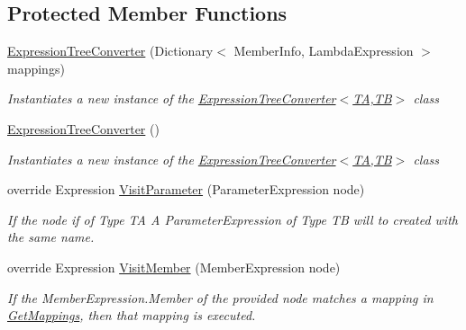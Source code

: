 \subsection*{Protected Member Functions}
\begin{DoxyCompactItemize}
\item 
\hyperlink{classCqrs_1_1Sql_1_1DataStores_1_1ExpressionTreeConverter_a6c0d0c72deab71e40aa9e1526fd82593_a6c0d0c72deab71e40aa9e1526fd82593}{Expression\+Tree\+Converter} (Dictionary$<$ Member\+Info, Lambda\+Expression $>$ mappings)
\begin{DoxyCompactList}\small\item\em Instantiates a new instance of the \hyperlink{classCqrs_1_1Sql_1_1DataStores_1_1ExpressionTreeConverter_a6c0d0c72deab71e40aa9e1526fd82593_a6c0d0c72deab71e40aa9e1526fd82593}{Expression\+Tree\+Converter$<$\+T\+A,\+T\+B$>$} class \end{DoxyCompactList}\item 
\hyperlink{classCqrs_1_1Sql_1_1DataStores_1_1ExpressionTreeConverter_a817ef7144b04df19798d7c5c718818b7_a817ef7144b04df19798d7c5c718818b7}{Expression\+Tree\+Converter} ()
\begin{DoxyCompactList}\small\item\em Instantiates a new instance of the \hyperlink{classCqrs_1_1Sql_1_1DataStores_1_1ExpressionTreeConverter_a6c0d0c72deab71e40aa9e1526fd82593_a6c0d0c72deab71e40aa9e1526fd82593}{Expression\+Tree\+Converter$<$\+T\+A,\+T\+B$>$} class \end{DoxyCompactList}\item 
override Expression \hyperlink{classCqrs_1_1Sql_1_1DataStores_1_1ExpressionTreeConverter_a88eef3bef4d4ad3caab1cd2cc033873b_a88eef3bef4d4ad3caab1cd2cc033873b}{Visit\+Parameter} (Parameter\+Expression node)
\begin{DoxyCompactList}\small\item\em If the {\itshape node}  if of Type {\itshape TA}  A Parameter\+Expression of Type {\itshape TB}  will to created with the same name. \end{DoxyCompactList}\item 
override Expression \hyperlink{classCqrs_1_1Sql_1_1DataStores_1_1ExpressionTreeConverter_ab6eca1d967e864aee4697f64ea9b23a0_ab6eca1d967e864aee4697f64ea9b23a0}{Visit\+Member} (Member\+Expression node)
\begin{DoxyCompactList}\small\item\em If the Member\+Expression.\+Member of the provided {\itshape node}  matches a mapping in \hyperlink{classCqrs_1_1Sql_1_1DataStores_1_1ExpressionTreeConverter_abd0d906a5b8abd8520874104d3bfcad0_abd0d906a5b8abd8520874104d3bfcad0}{Get\+Mappings}, then that mapping is executed. \end{DoxyCompactList}\item 

\end{DoxyCompactItemize}
